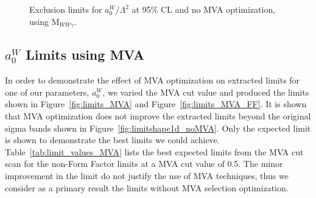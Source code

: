\begin{figure}[hb]
  \begin{center}
    \caption{ Exclusion limits for $a_{0}^{W}/\Lambda^{2}$ at 95\% CL and no MVA optimization, using M$_{WW\gamma}$.}
    \label{fig:limits_Mlvjja}
  \end{center}
\end{figure}

\subsection{$a_{0}^{W}$ Limits using MVA}
\label{sec:limits_MVA}
In order to demonstrate the effect of MVA optimization on extracted limits
for one of our parameters, $a_{0}^{W}$, we varied the MVA cut value and
produced the limits shown in Figure~\ref{fig:limits_MVA} and 
Figure~\ref{fig:limits_MVA_FF}. It is shown that
MVA optimization does not improve the extracted limits beyond the original
sigma bands shown in Figure~\ref{fig:limitshape1d_noMVA}. Only the expected
limit is shown to demonstrate the best limits we could achieve. 
Table~\ref{tab:limit_values_MVA} lists the best expected limits from the MVA 
cut scan for the non-Form Factor limits at a MVA cut value of 0.5. 
The minor improvement in the limit do not justify the use of MVA techniques, thus we consider as a primary result the limits without MVA selection optimization.

\begin{table}[htb]
\centering
{}
  \caption{95\% CL shape-based expected limits listed for both the muon and electron channels of the AQGC parameter $a_{0}^{W}/\Lambda^{2}$, using Photon $p_{T}$ and with MVA optimization cut = 0.5.}
  \label{tab:limit_values_MVA}
\end{table}

